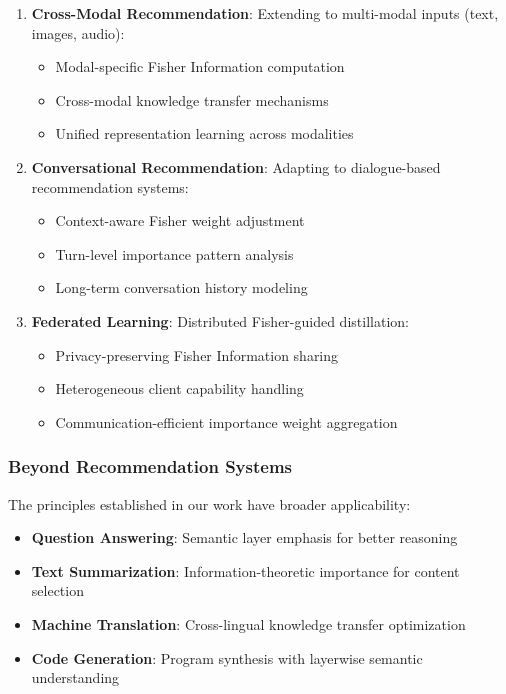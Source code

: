 \documentclass[10pt,conference]{IEEEtran}
\begin{document}
\begin{enumerate}[leftmargin=*]
    \item \textbf{Cross-Modal Recommendation}: Extending to multi-modal inputs (text, images, audio):
    \begin{itemize}
        \item Modal-specific Fisher Information computation
        \item Cross-modal knowledge transfer mechanisms
        \item Unified representation learning across modalities
    \end{itemize}
    
    \item \textbf{Conversational Recommendation}: Adapting to dialogue-based recommendation systems:
    \begin{itemize}
        \item Context-aware Fisher weight adjustment
        \item Turn-level importance pattern analysis
        \item Long-term conversation history modeling
    \end{itemize}
    
    \item \textbf{Federated Learning}: Distributed Fisher-guided distillation:
    \begin{itemize}
        \item Privacy-preserving Fisher Information sharing
        \item Heterogeneous client capability handling
        \item Communication-efficient importance weight aggregation
    \end{itemize}
\end{enumerate}

\subsubsection{Beyond Recommendation Systems}

The principles established in our work have broader applicability:

\begin{itemize}[leftmargin=*]
    \item \textbf{Question Answering}: Semantic layer emphasis for better reasoning
    \item \textbf{Text Summarization}: Information-theoretic importance for content selection
    \item \textbf{Machine Translation}: Cross-lingual knowledge transfer optimization
    \item \textbf{Code Generation}: Program synthesis with layerwise semantic understanding
\end{itemize}
\end{document}
